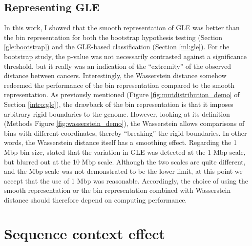 \subsection{Representing GLE}
In this work, I showed that the smooth representation of GLE was better than the bin representation for both the bootstrap hypothesis testing (Section \ref{gle:bootstrap}) and the GLE-based classification (Section \ref{ml:gle}). For the bootstrap study, the p-value was not necessarily contrasted against a significance threshold, but it really was an indication of the ``extremity'' of the observed distance between cancers. Interestingly, the Wasserstein distance somehow redeemed the performance of the bin representation compared to the smooth representation. As previously mentioned (Figure \ref{fig:mutdistribution_demo} of Section \ref{intro:gle}), the drawback of the bin representation is that it imposes arbitrary rigid boundaries to the genome. However, looking at its definition (Methods Figure \ref{fig:wasserstein_demo}), the Wasserstein allows comparisons of bins with different coordinates, thereby ``breaking'' the rigid boundaries. In other words, the Wasserstein distance itself has a smoothing effect. Regarding the 1 Mbp bin size, \citet{Hodgkinson2012TheGenomes} stated that the variation in GLE was detected at the 1 Mbp scale, but blurred out at the 10 Mbp scale. Although the two scales are quite different, and the Mbp scale was not demonstrated to be the lower limit, at this point we accept that the use of 1 Mbp was reasonable. Accordingly, the choice of using the smooth representation or the bin representation combined with Wasserstein distance should therefore depend on computing performance. 

\section{Sequence context effect}\label{discussion:sce}
